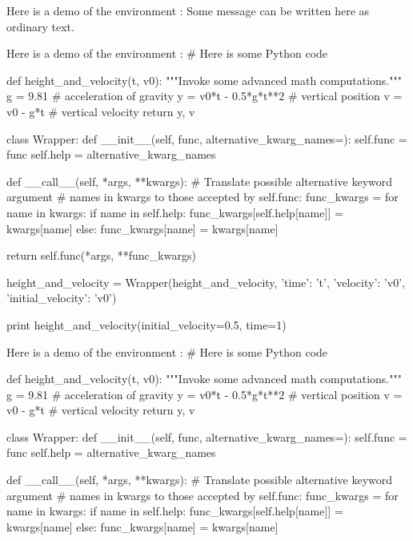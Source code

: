 \noindent
Here is a demo of the environment :
Some message can be written here as ordinary
text.


\noindent
Here is a demo of the environment :
# Here is some Python code

def height_and_velocity(t, v0):
    """Invoke some advanced math computations."""
    g = 9.81                  # acceleration of gravity
    y = v0*t - 0.5*g*t**2     # vertical position
    v = v0 - g*t              # vertical velocity
    return y, v

class Wrapper:
    def __init__(self, func, alternative_kwarg_names={}):
        self.func = func
        self.help = alternative_kwarg_names

    def __call__(self, *args, **kwargs):
        # Translate possible alternative keyword argument
        # names in kwargs to those accepted by self.func:
        func_kwargs = {}
        for name in kwargs:
            if name in self.help:
                func_kwargs[self.help[name]] = kwargs[name]
            else:
                func_kwargs[name] = kwargs[name]

        return self.func(*args, **func_kwargs)

height_and_velocity = Wrapper(height_and_velocity,
                              {'time': 't',
                               'velocity': 'v0',
                               'initial_velocity': 'v0'})

print height_and_velocity(initial_velocity=0.5, time=1)


\noindent
Here is a demo of the environment :
# Here is some Python code

def height_and_velocity(t, v0):
    """Invoke some advanced math computations."""
    g = 9.81                  # acceleration of gravity
    y = v0*t - 0.5*g*t**2     # vertical position
    v = v0 - g*t              # vertical velocity
    return y, v

class Wrapper:
    def __init__(self, func, alternative_kwarg_names={}):
        self.func = func
        self.help = alternative_kwarg_names

    def __call__(self, *args, **kwargs):
        # Translate possible alternative keyword argument
        # names in kwargs to those accepted by self.func:
        func_kwargs = {}
        for name in kwargs:
            if name in self.help:
                func_kwargs[self.help[name]] = kwargs[name]
            else:
                func_kwargs[name] = kwargs[name]

